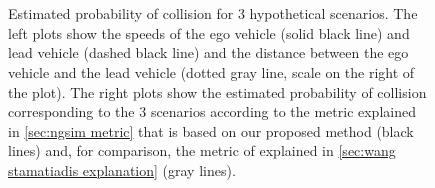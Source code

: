 \setlength{\figurewidth}{.45\linewidth}
\setlength{\figureheight}{0.6\figurewidth}
\begin{figure}
	\centering
	
	\\
	
	\\
	
	
	\caption{Estimated probability of collision for 3 hypothetical scenarios. 
		The left plots show the speeds of the ego vehicle (solid black line) and lead vehicle (dashed black line) and the distance between the ego vehicle and the lead vehicle (dotted gray line, scale on the right of the plot).
		The right plots show the estimated probability of collision corresponding to the 3 scenarios according to the metric explained in \cref{sec:ngsim metric} that is based on our proposed method (black lines) and, for comparison, the metric of \textcite{wang2014evaluation} explained in \cref{sec:wang stamatiadis explanation} (gray lines).}
	\label{fig:scenarios}		
\end{figure}
